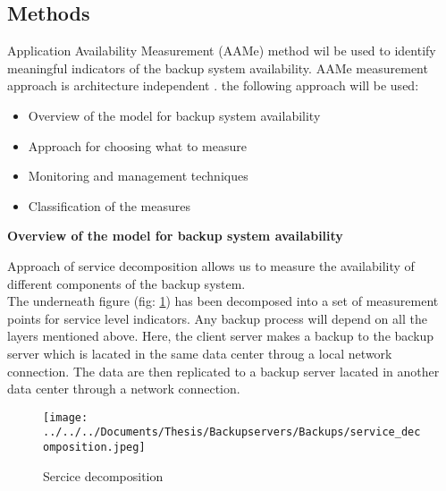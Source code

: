 \documentclass[english]{tktltiki2}
\theoremstyle{definition}
\theoremstyle{remark}
\begin{document}
\subsection{Methods}
Application Availability Measurement (AAMe) method wil be used to  identify meaningful indicators of the backup system availability. AAMe measurement approach is  architecture independent \cite{AAMES}. the following approach will be used:
\begin{itemize}
\item Overview of the model for backup system availability
\end{itemize}
\begin{itemize}
\item Approach for choosing what to measure
\end{itemize}
\begin{itemize}
\item Monitoring and management techniques
\end{itemize}
\begin{itemize}
\item Classification of the measures
\end{itemize}
\pagebreak

\begin{flushleft}
\textbf{Overview of the model for backup system availability}
\end{flushleft}
 Approach of service decomposition allows us to measure the availability of different components of the backup system.\\
The underneath figure (fig: \ref{fig:Backupavailability}) has been decomposed into a set of measurement points
for service level indicators. Any backup process will depend on all the layers mentioned above. Here, the client server makes a backup to the backup server which is lacated in the same data center throug a local network connection. The data are then replicated to a backup server lacated in another data center through a network connection.

\begin{figure}[h!]
\texttt{[image: ../../../Documents/Thesis/Backupservers/Backups/service\_decomposition.jpeg]} 
\caption{Sercice decomposition}
\label{fig:Backupavailability} 
\end{figure}
\pagebreak
\end{document}
